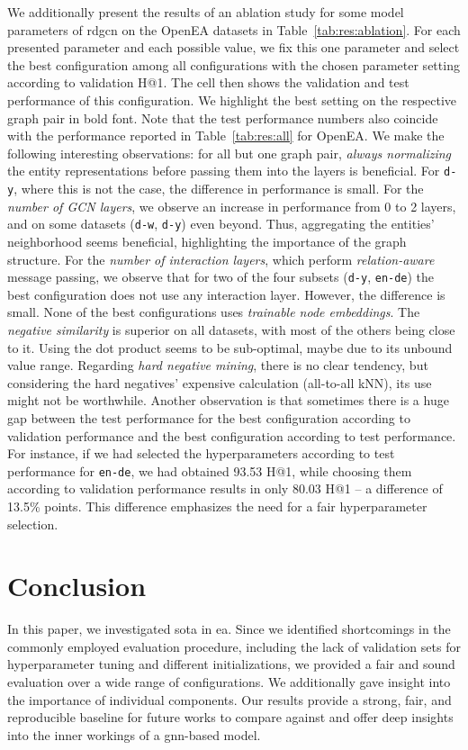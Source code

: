 \documentclass[runningheads]{llncs}
\begin{document}
We additionally present the results of an ablation study for some model parameters of \acrshort{rdgcn} on the OpenEA datasets in Table~\ref{tab:res:ablation}.
For each presented parameter and each possible value, we fix this one parameter and select the best configuration among all configurations with the chosen parameter setting according to validation H@1.
The cell then shows the validation and test performance of this configuration.
We highlight the best setting on the respective graph pair in bold font.
Note that the test performance numbers also coincide with the performance reported in Table~\ref{tab:res:all} for OpenEA.
We make the following interesting observations:
for all but one graph pair, \emph{always normalizing} the entity representations before passing them into the layers is beneficial.
For \texttt{d-y}, where this is not the case, the difference in performance is small.
For the \emph{number of GCN layers}, we observe an increase in performance from 0 to 2 layers, and on some datasets (\texttt{d-w}, \texttt{d-y}) even beyond.
Thus, aggregating the entities' neighborhood seems beneficial, highlighting the importance of the graph structure.
For the \emph{number of interaction layers}, which perform \emph{relation-aware} message passing, we observe that for two of the four subsets (\texttt{d-y}, \texttt{en-de}) the best configuration does not use any interaction layer.
However, the difference is small.
None of the best configurations uses \emph{trainable node embeddings}.
The \emph{negative  similarity} is superior on all datasets, with most of the others being close to it.
Using the dot product seems to be sub-optimal, maybe due to its unbound value range.
Regarding \emph{hard negative mining}, there is no clear tendency, but considering the hard negatives' expensive calculation (all-to-all kNN), its use might not be worthwhile.
Another observation is that sometimes there is a huge gap between the test performance for the best configuration according to validation performance and the best configuration according to test performance.
For instance, if we had selected the hyperparameters according to test performance for \texttt{en-de}, we had obtained 93.53 H@1, while choosing them according to validation performance results in only 80.03 H@1 -- a difference of 13.5\% points.
This difference emphasizes the need for a fair hyperparameter selection.

\section{Conclusion}
\label{sec:conclusion}
In this paper, we investigated \acrlong{sota} in \acrlong{ea}.
Since we identified shortcomings in the commonly employed evaluation procedure, including the lack of validation sets for hyperparameter tuning and different initializations, we provided a fair and sound evaluation over a wide range of configurations. We additionally gave insight into the importance of individual components.
Our results provide a strong, fair, and reproducible baseline for future works to compare against and offer deep insights into the inner workings of a \acrshort{gnn}-based model.
\end{document}
